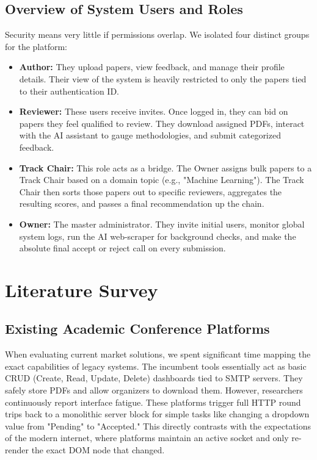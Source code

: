 \documentclass[12pt,a4paper]{report}
\begin{document}
\section{Overview of System Users and Roles}
Security means very little if permissions overlap. We isolated four distinct groups for the platform:
\begin{itemize}
    \item \textbf{Author:} They upload papers, view feedback, and manage their profile details. Their view of the system is heavily restricted to only the papers tied to their authentication ID.
    \item \textbf{Reviewer:} These users receive invites. Once logged in, they can bid on papers they feel qualified to review. They download assigned PDFs, interact with the AI assistant to gauge methodologies, and submit categorized feedback.
    \item \textbf{Track Chair:} This role acts as a bridge. The Owner assigns bulk papers to a Track Chair based on a domain topic (e.g., "Machine Learning"). The Track Chair then sorts those papers out to specific reviewers, aggregates the resulting scores, and passes a final recommendation up the chain.
    \item \textbf{Owner:} The master administrator. They invite initial users, monitor global system logs, run the AI web-scraper for background checks, and make the absolute final accept or reject call on every submission.
\end{itemize}

\chapter{Literature Survey}

\section{Existing Academic Conference Platforms}
When evaluating current market solutions, we spent significant time mapping the exact capabilities of legacy systems. The incumbent tools essentially act as basic CRUD (Create, Read, Update, Delete) dashboards tied to SMTP servers. They safely store PDFs and allow organizers to download them. However, researchers continuously report interface fatigue. These platforms trigger full HTTP round trips back to a monolithic server block for simple tasks like changing a dropdown value from "Pending" to "Accepted." This directly contrasts with the expectations of the modern internet, where platforms maintain an active socket and only re-render the exact DOM node that changed.
\end{document}
